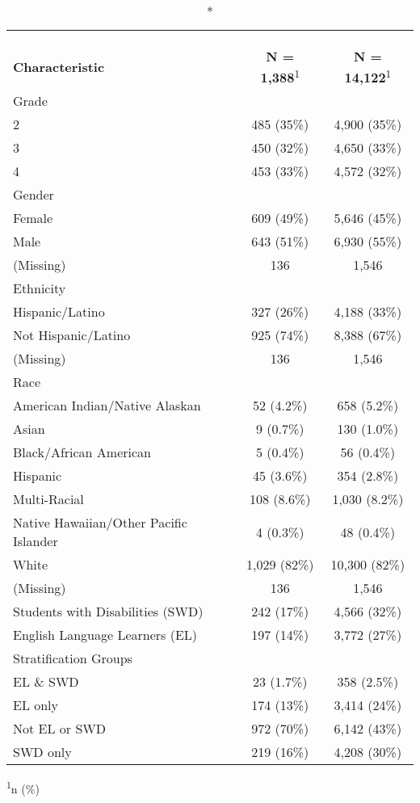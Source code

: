 \documentclass[
]{article}
\begin{document}
\captionsetup[table]{labelformat=empty,skip=1pt}
\begin{longtable}{lcc}
\caption*{
\large Sample Demographic Characteristics\\ 
} \\ 
\toprule
& & & \\ 
 
\textbf{Characteristic} & \textbf{N = 1,388}\textsuperscript{1} & \textbf{N = 14,122}\textsuperscript{1} \\ 
\midrule
Grade &  &  \\ 
2 & 485 (35\%) & 4,900 (35\%) \\ 
3 & 450 (32\%) & 4,650 (33\%) \\ 
4 & 453 (33\%) & 4,572 (32\%) \\ 
Gender &  &  \\ 
Female & 609 (49\%) & 5,646 (45\%) \\ 
Male & 643 (51\%) & 6,930 (55\%) \\ 
(Missing) & 136 & 1,546 \\ 
Ethnicity &  &  \\ 
Hispanic/Latino & 327 (26\%) & 4,188 (33\%) \\ 
Not Hispanic/Latino & 925 (74\%) & 8,388 (67\%) \\ 
(Missing) & 136 & 1,546 \\ 
Race &  &  \\ 
American Indian/Native Alaskan & 52 (4.2\%) & 658 (5.2\%) \\ 
Asian & 9 (0.7\%) & 130 (1.0\%) \\ 
Black/African American & 5 (0.4\%) & 56 (0.4\%) \\ 
Hispanic & 45 (3.6\%) & 354 (2.8\%) \\ 
Multi-Racial & 108 (8.6\%) & 1,030 (8.2\%) \\ 
Native Hawaiian/Other Pacific Islander & 4 (0.3\%) & 48 (0.4\%) \\ 
White & 1,029 (82\%) & 10,300 (82\%) \\ 
(Missing) & 136 & 1,546 \\ 
Students with Disabilities (SWD) & 242 (17\%) & 4,566 (32\%) \\ 
English Language Learners (EL) & 197 (14\%) & 3,772 (27\%) \\ 
Stratification Groups &  &  \\ 
EL \& SWD & 23 (1.7\%) & 358 (2.5\%) \\ 
EL only & 174 (13\%) & 3,414 (24\%) \\ 
Not EL or SWD & 972 (70\%) & 6,142 (43\%) \\ 
SWD only & 219 (16\%) & 4,208 (30\%) \\ 
\bottomrule
\end{longtable}
\vspace{-5mm}
\begin{minipage}{\linewidth}
\textsuperscript{1}n (\%) \\ 
\end{minipage}
\end{document}
